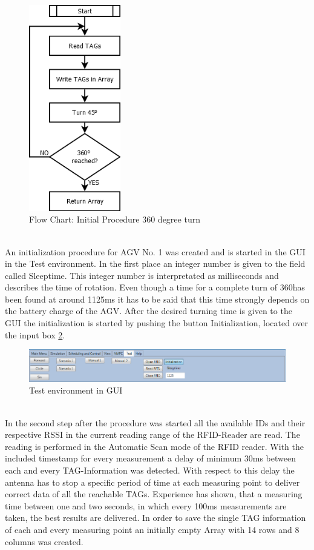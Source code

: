 \begin{figure}[!htbp]
\centering
\includegraphics[width = 4cm]{Pictures/SFC_Init_Procedure}
\caption{Flow Chart: Initial Procedure 360 degree turn}
\label{SFC_Init_Procedure}
\end{figure}\\
An initialization procedure for AGV No. 1 was created and is started in the GUI in the Test environment. In the first place an integer number is given to the field called Sleeptime. This integer number is interpretated as milliseconds and describes the time of rotation. Even though a time for a complete turn of 360\textdegree  has been found at around 1125ms it has to be said that this time strongly depends on the battery charge of the AGV. After the desired turning time is given to the GUI the initialization is started by pushing the button Initialization, located over the input box \ref{Screenshot_Test_environment}.\\
\begin{figure}[!htbp]
\centering
\includegraphics[width = 16cm]{Pictures/Screenshot_Test_environment}
\caption{Test environment in GUI}
\label{Screenshot_Test_environment}
\end{figure}\\
In the second step after the procedure was started all the available IDs and their respective RSSI in the current reading range of the RFID-Reader are read. The reading is performed in the Automatic Scan mode of the RFID reader. With the included timestamp for every measurement a delay of minimum 30ms between each and every TAG-Information was detected. With respect to this delay the antenna has to stop a specific period of time at each measuring point to deliver correct data of all the reachable TAGs. Experience has shown, that a measuring time between one and two seconds, in which every 100ms measurements are taken, the best results are delivered. In order to save the single TAG information of each and every measuring point an initially empty Array with 14 rows and 8 columns was created. 
